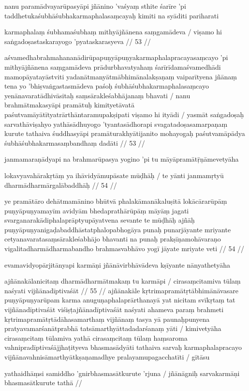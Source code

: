 nanu paramādvayarūpasyāpi jñānino 'vaśyaṃ sthite śarīre 'pi taddhetukaśubhāśubhakarmaphalasaṃcayaḥ kimiti na syāditi pariharati

karmaphalaṃ śubhamaśubhaṃ mithyājñānena saṃgamādeva  /
viṣamo hi saṅgadoṣastaskarayogo 'pyataskarasyeva  // 53  //

aśvamedhabrahmahananādirūpapuṇyāpuṇyakarmaphalapracayasaṃcayo 'pi mithyājñānena saṃgamādeva prādurbhavatyahaṃ śarīrīdamaśvamedhādi mamopāyatayāstviti yadanātmanyātmābhimānalakṣaṇaṃ vaiparītyena jñānaṃ tena yo 'bhiṣvaṅgastasmādeva paśoḥ śubhāśubhakarmaphalasaṃcayo yenānavaratādhivāsitaḥ saṃsārakleśabhājanaṃ bhavati  / nanu brahmātmakasyāpi pramātuḥ kimityetāvatā paśutvamāyātītyatrārthāntaramupakṣipati viṣamo hi ityādi  / yasmāt saṅgadoṣaḥ sarvathāviṣahyo yathāsādhuyogo 'tyantasādhorapi svagatadoṣasamarpaṇaṃ kurute tathaiva śuddhasyāpi pramāturakhyātijanito mohayogaḥ paśutvamāpādya śubhāśubhakarmasaṃbandhaṃ dadāti  // 53  //

janmamaraṇādyapi na brahmarūpasya yogino 'pi tu māyāpramātṝṇāmevetyāha

lokavyavahārakṛtāṃ ya ihāvidyāmupāsate mūḍhāḥ  /
te yānti janmamṛtyū dharmādharmārgalābaddhāḥ  // 54  //

ye pramātāro dehātmamānino bhūtvā phalakāmanākaluṣitā lokācārarūpāṃ puṇyāpuṇyamayīm avidyām bhedaprathārūpāṃ māyāṃ jagati svarganarakādiphalaprāptyupāyatvena sevante te mūḍhāḥ ajñāḥ puṇyāpuṇyanigaḍabaddhāstatphalopabhogāya punaḥ punarjāyante mriyante cetyanavaratasaṃsārakleśabhājo bhavanti na punaḥ prakṣīṇamohāvaraṇo vigalitadharmādharmabandho brahmasvabhāvo yogī jāyate mriyate veti  // 54  //

evamavidyopārjitānyapi karmāṇi jñānāvirbhāvādeva kṣīyante nānyathetyāha

ajñānakālanicitaṃ dharmādharmātmakaṃ tu karmāpi  /
cirasaṃcitamiva tūlaṃ naśyati vijñānadīptivaśāt  // 55  //
ajñānakāle kṛtrimapramātṛtābhimānāvasare puṇyāpuṇyarūpam karma anuguṇaphalaprārthanayā yat nicitam svīkṛtaṃ tat vijñānadīptivaśāt viśiṣṭajñānadīptivaśāt naśyati ahameva paraṃ brahmeti kṛtrimapramātṛtādāhasamarthaṃ vijñānaṃ tasya yā paunaḥpunyena pratyavamarśanātprabhā tatsāmarthyāttadadarśanaṃ yāti  / kimivetyāha cirasaṃcitaṃ tūlamiva yathā cirasaṃcitaṃ tūlaṃ haṃsaroma vahnipradīptivaśājjhaṭityeva bhasmasādyāti tathaiva sarvaḥ karmaphalapracayo vijñānavahnisāmarthyātkṣaṇamadhye pralayamupagacchatīti  / gītāsu

yathaidhāṃsi samiddho 'gnirbhasmasātkurute 'rjuna  /
jñānāgniḥ sarvakarmāṇi bhasmasātkurute tathā  //

